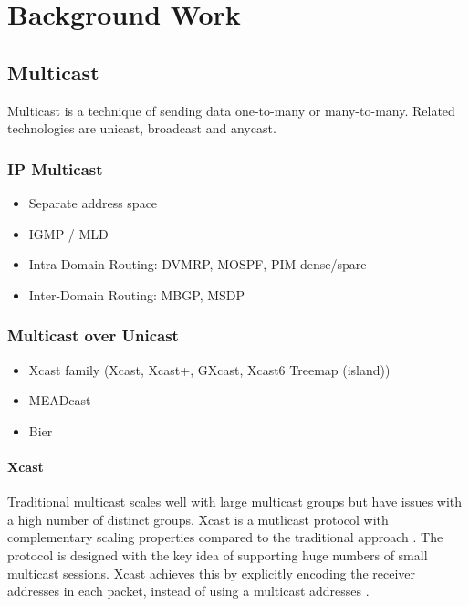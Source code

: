 \chapter{Background Work} %
\label{chap:Background Work}

\section{Multicast} %
\label{sec:Mutlicast}
Multicast is a technique of sending data one-to-many or many-to-many.
Related technologies are unicast, broadcast and anycast.

\subsection{IP Multicast} %
\label{sub:IP Multicast}
\begin{itemize}\itemsep0em
    \item Separate address space
    \item IGMP / MLD
    \item Intra-Domain Routing: DVMRP, MOSPF, PIM dense/spare
    \item Inter-Domain Routing: MBGP, MSDP
\end{itemize}


\subsection{Multicast over Unicast} %
\label{sub:Multicast over Unicast}
\begin{itemize}\itemsep0em
    \item Xcast family (Xcast, Xcast+, GXcast, Xcast6 Treemap (island))
    \item MEADcast
    \item Bier
\end{itemize}

\subsubsection{Xcast}
Traditional multicast scales well with large multicast groups but have issues
with a high number of distinct groups.
Xcast is a mutlicast protocol with complementary scaling properties compared to
the traditional approach \cite{xcast_rfc}.
The protocol is designed with the key idea of supporting huge numbers of small
multicast sessions.
Xcast achieves this by explicitly encoding the receiver addresses in each
packet, instead of using a multicast addresses \cite{xcast_rfc}.

